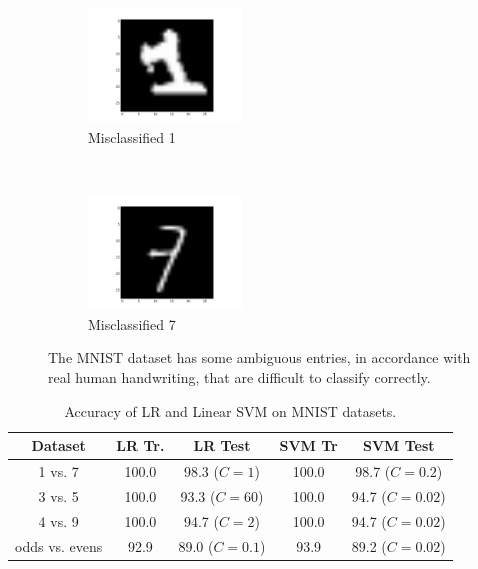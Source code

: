 \begin{figure}\label{fig:misclassified}
    \centering
    \begin{subfigure}[b]{0.5\columnwidth}
        \centering
        \includegraphics[height=1.2in]{figures/4_1_bad1}
        \caption{Misclassified 1}
    \end{subfigure}%
    ~ 
    \begin{subfigure}[b]{0.5\columnwidth}
        \centering
        \includegraphics[height=1.2in]{figures/4_1_bad7}
        \caption{Misclassified 7}
    \end{subfigure}
    \caption{The MNIST dataset has some ambiguous entries, in accordance with real human handwriting, that are difficult to classify correctly.}
\end{figure}

\begin{table}[ht!]
\centering
\begin{tabular}{||c c c c c||}  
 \hline
 Dataset & LR Tr. & LR Test & SVM Tr & SVM Test \\ [0.3ex] 
 \hline\hline
 1 vs. 7 & 100.0 & 98.3 ($C=1$) & 100.0 & 98.7 ($C=0.2$) \\ 
 \hline
 3 vs. 5 & 100.0 & 93.3 ($C=60$) & 100.0 & 94.7 ($C=0.02$) \\ 
 \hline
 4 vs. 9 & 100.0 & 94.7 ($C=2$) & 100.0 & 94.7 ($C=0.02$) \\ 
 \hline
 odds vs. evens & 92.9 & 89.0 ($C=0.1$) & 93.9 & 89.2 ($C=0.02$) \\ 
 \hline
\end{tabular}
\caption{Accuracy of LR and Linear SVM on MNIST datasets.}
\label{table_4_1}
\end{table}

